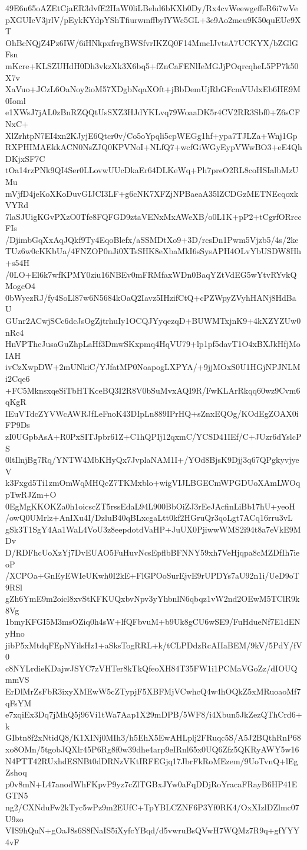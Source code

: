 49E6u65oAZEtCjaER3dvfE2HaW0liLBehd6bKXb0Dy/Rx4cvWeewgeffeR6i7wVe
pXGUIcV3jrlV/pEykKYdpYShTfiurwmffbylYWc5GL+3e9Ao2mcu9K50quEUe9XT
OhBcNQjZ4Pz6IW/6iHNkpxfrrgBWSfvrIKZQ0F14MmcIJvtsA7UCKYX/bZGlGFsn
mKcre+KLSZUHdH0Dh3vkzXk3X6bq5+fZnCaFENlIeMGJjPOqrcqheL5PP7k50X7v
XaVuo+JCzL6OaNoy2ioM57XDgbNqaXOft+jBbDemUjRbGFcmVUdxEb6HE9M0Ioml
e1XWsJ7jAL0zBnRZQQtUsSXZ3HJdYKLvq79WoaaDK5r4CV2RR3Sbf0+Z6sCFNxC+
XlZrhtpN7EI4xn2KJyjE6Qtcr0v/Co5oYpqli5cpWEGg1hf+ypa7TJLZa+Wnj1Gp
RXPHIMAEkkACN0NsZJQ0KPVNoI+NLfQ7+wcfGiWGyEypVWwBO3+eE4QhDKjxSF7C
tOa14rzPNk9QI4Ser0LLovwUUcDkaEr64DLKeWq+Ph7preO2RL8coHSIalbMzUMu
mVjfD4jeKoXKoDuvGIJCI3LF+g6cNK7XFZjNPBaeaA35lZCDGzMETNEcqoxkVYRd
7laSJUigKGvPXzO0Tfe8FQFGD9ztaVENxMxAWeXB/o0L1K+pP2+tCgrfORrccFIs
/DjimbGqXxAqJQkf9Ty4EqoBlefx/aSSMDtXo9+3D/rcsDn1Pwm5Vjzb5/4s/2ke
TUz6w0cKKbUa/4FNZOP0nJi0XTsSHK8eXbaMkI6sSysAPH4OLvYbUSDW8Hh+s54H
/0LO+El6k7wfKPMY0ziu16NBEv0mFRMfaxWDn0BaqYZtVdEG5wYtvRYvkQMogcO4
0bWyezRJ/fy4SoLl87w6N5684kOaQ2Iavz5IHzifCtQ+cPZWpyZVyhHANj8HdBaU
GUnr2ACwjSCc6dcJsOgZjtrhuIy1OCQJYyqezqD+BUWMTxjnK9+4kXZYZUw0nRc4
HnVPThcJusaGuZhpLaHf3DmwSKxpmq4HqVU79+lp1pf5davT1O4xBXJkHfjMoIAH
ivCzXwpDW+2mUNkiC/YJfatMP0NoapogLXPYA/+9jjMOxS0U1HGjNPJNLMi2Cqe6
+FC5MknsxqeSiTbHTKceBQ3I2R8V0bSuMvxAQI9R/FwKLArRkqq60wz9Cvm6qKgR
IEuVTdcZYVWcAWRJfLeFnoK43DIpLn889IPrHQ+sZnxEQOg/KOdEgZOAX0iFP9Ds
zI0UGpbAsA+R0PxSITJpbr61Z+C1hQPIj12qxmC/YCSD41IEf/C+JUzr6dYslcPS
0ltIlnjBg7Rq/YNTW4MbKHyQx7JvplaNAM1I+/YOd8BjsK9Djj3q67QPgkyvjyeV
k3Fxgd5Ti1zmOmWqMHQcZ7TKMxblo+wigVIJLBGECmWPGDUoXAmLWOqpTwRJZm+O
0EgMgKKOKZa0h1oicscZT5rssEdaL94L900BbOiZJ3rEeJAcfinLiBb17hU+yeoH
/owQ0UMrlz+AnIXu4I/DzluB40qBLxcgaLtt0kf2HGruQr3qoLgt7ACq16rru3vL
gSk3T1SgY4Aa1WaL4VoU3z8eepdotdVaHP+JuUX0PjiwwWMS2i94t8a7eVkE9MDv
D/RDFhcUoXzYj7DvEUAO5FuHuvNcsEpflbBFNNY59xh7VeHjqpa8cMZDfIh7ieoP
/XCPOa+GnEyEWIeUKwh0I2kE+FlGPOoSurEjvE9rUPDYs7aU92n1i/UeD9oT9RSl
gZh6YmE9m2oicl8xvStKFKUQxbvNpv3yYhbnlN6qbqz1vW2nd2OEwM5TClR9k8Vg
1bmyKFGI5M3msOZiq0h4sW+lfQFbvuM+b9Uk8gCU6wSE9/FuHdueNf7E1dENyHno
jibP5xMtdqFEpNYilsHz1+aSksTogRRL+k/tCLPDdzRcAIIaBEM/9kV/5PdY/fV0
c8NYLrdieKDajwJSYC7zVHTer8kTkQfeoXH84T35FW1i1PCMaVGoZz/dIOUQmmVS
ErDlMrZsFbR3ixyXMEwW5cZTypjF5XBFMjVCwhcQ4w4hOQkZ5xMRuoaoMf7qFsYM
e7xqiEx3Dq7jMhQ5j96Vi1tWa7Aap1X29mDPB/5WF8/i4Xbun5JkZezQThCrd6+k
GIbtn8f2xNtidQ8/K1XINj0MIh3/h5EhX5EwAHLplj2FRuqc5S/A5J2BQthRnP68
xo8OMn/5tgobJQXlr45P6Rg8f0w39dhe4arp9eIRnl65x0UQ6Zfz5QKRyAWY5w16
N4PTT42RUxhdESNBt0dDRNzVKtIRFEGjq17JbrFkRoMEzem/9UoTvnQ+lEgZshoq
p0v8mN+L47anodWhFKpvP9yz7cZlTGBxJYw0aFqDDjRoYracaFRayB6HP41EGTN5
ng2/CXNduFw2kTyc5wPz9m2EUfC+TpYBLCZNF6P3Yf0RK4/OxXIzlDZlmc07U9zo
VIS9hQuN+gOaJ8s6S8fNaIS5iXyfcYBqd/d5vwruBsQVwH7WQMz7R9q+gfYYY4vF
